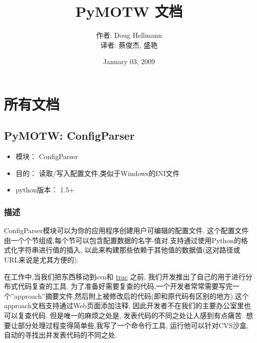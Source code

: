 \documentclass[a4paper,10pt,english]{manual}
\title{PyMOTW 文档}
\date{January 03, 2009}
\author{作者: Doug Hellmann \\译者:  蔡俊杰, 盛艳}
\begin{document}

\maketitle
\cleardoublepage
\tableofcontents
\cleardoublepage
\resetcurrentobjects


\chapter{所有文档}
\resetcurrentobjects

\section{PyMOTW: ConfigParser}
\begin{itemize}
\item {} 
模块： ConfigParser

\item {} 
目的： 读取/写入配置文件,类似于Windows的INI文件

\item {} 
python版本： 1.5+

\end{itemize}


\subsection{描述}

ConfigParser模块可以为你的应用程序创建用户可编辑的配置文件. 这个配置文件由一个个节组成,每个节可以包含配置数据的名字-值对.支持通过使用Python的格式化字符串进行值的插入, 以此来构建那些依赖于其他值的数据值(这对路径或URL来说是尤其方便的).

在工作中,当我们把东西移动到svn和 \href{http://trac.edgewall.org/}{trac} 之前, 我们开发推出了自己的用于进行分布式代码复查的工具. 为了准备好需要复查的代码,一个开发者常常需要写完一个''approach''摘要文件,然后附上被修改后的代码(即和原代码有区别的地方).这个 approach文档支持通过Web页面添加注释, 因此开发者不在我们的主要办公室里也可以复查代码. 但是唯一的麻烦之处是, 发表代码的不同之处让人感到有点痛苦. 想要让部分处理过程变得简单些,我写了一个命令行工具, 运行他可以针对CVS沙盒,自动的寻找出并发表代码的不同之处.
\end{document}

